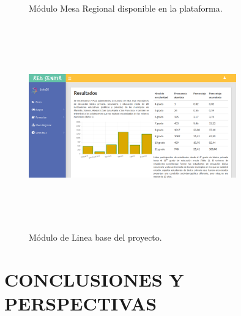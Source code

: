 \documentclass[a4paper]{article}
\begin{document}
\begin{figure}[tbp]
  \centering
	  \hspace{1mm}
  \caption{Módulo Mesa Regional disponible en la plataforma. }
  \label{fig:mesa}
\end{figure}

\begin{figure}[t]
\centering
\includegraphics[width=0.8\textwidth,height=3.5in]{resultados.png}
\caption{Módulo de Linea base del proyecto.}
\label{fig:lineabase}
\end{figure}

\section{CONCLUSIONES Y PERSPECTIVAS}\label{sec:conclusiones}


\clearpage


\end{document}

